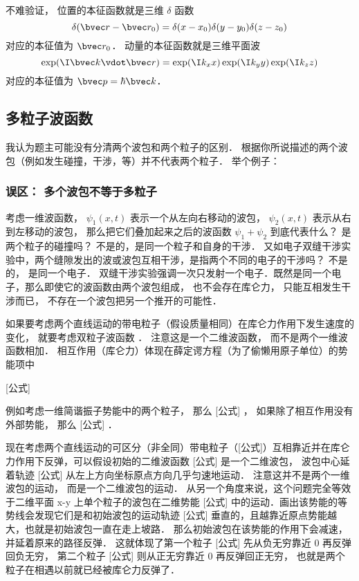 不难验证， 位置的本征函数就是三维 $\delta$ 函数
\begin{equation}
\delta(\bvec r - \bvec r_0) = \delta(x - x_0) \delta(y - y_0) \delta(z - z_0)
\end{equation}
对应的本征值为 $\bvec r_0$． 动量的本征函数就是三维平面波
\begin{equation}
\exp(\I \bvec k \vdot \bvec r) = \exp(\I k_x x) \exp(\I k_y y) \exp(\I k_z z)
\end{equation}
对应的本征值为 $\bvec p = \hbar\bvec k$．

\subsection{多粒子波函数}
我认为题主可能没有分清两个波包和两个粒子的区别． 根据你所说描述的两个波包（例如发生碰撞，干涉，等）并不代表两个粒子． 举个例子：

\subsubsection{误区： 多个波包不等于多粒子}
考虑一维波函数， $\psi_1(x,t)$ 表示一个从左向右移动的波包， $\psi_2(x,t)$ 表示从右到左移动的波包， 那么把它们叠加起来之后的波函数 $\psi_1 + \psi_2$ 到底代表什么？ 是两个粒子的碰撞吗？ 不是的，是同一个粒子和自身的干涉． 又如电子双缝干涉实验中，两个缝隙发出的波或波包互相干涉，是指两个不同的电子的干涉吗？ 不是的， 是同一个电子． 双缝干涉实验强调一次只发射一个电子．既然是同一个电子，那么即使它的波函数由两个波包组成， 也不会存在库仑力， 只能互相发生干涉而已， 不存在一个波包把另一个推开的可能性．

如果要考虑两个直线运动的带电粒子（假设质量相同）在库仑力作用下发生速度的变化， 就要考虑双粒子波函数 $$． 注意这是一个二维波函数， 而不是两个一维波函数相加． 相互作用（库仑力）体现在薛定谔方程（为了偷懒用原子单位）的势能项中

[公式]

例如考虑一维简谐振子势能中的两个粒子， 那么 [公式] ， 如果除了相互作用没有外部势能， 那么 [公式] ．

现在考虑两个直线运动的可区分（非全同）带电粒子（[公式]）互相靠近并在库仑力作用下反弹，可以假设初始的二维波函数 [公式] 是一个二维波包， 波包中心延着轨迹 [公式] 从左上方向坐标原点方向几乎匀速地运动． 注意这并不是两个一维波包的运动， 而是一个二维波包的运动． 从另一个角度来说，这个问题完全等效于二维平面 x-y 上单个粒子的波包在二维势能 [公式] 中的运动．画出该势能的等势线会发现它们是和初始波包的运动轨迹 [公式] 垂直的，且越靠近原点势能越大，也就是初始波包一直在走上坡路． 那么初始波包在该势能的作用下会减速，并延着原来的路径反弹． 这就体现了第一个粒子 [公式] 先从负无穷靠近 0 再反弹回负无穷， 第二个粒子 [公式] 则从正无穷靠近 0 再反弹回正无穷， 也就是两个粒子在相遇以前就已经被库仑力反弹了．
